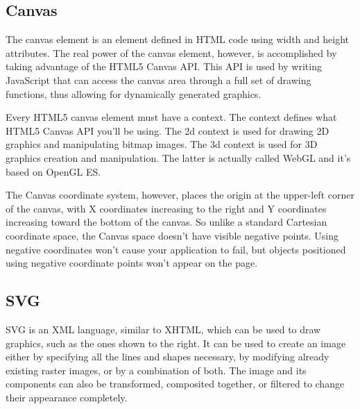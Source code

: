 






\subsection{Canvas}

The canvas element is an element defined in HTML code using width and height attributes. The real power of the canvas element, however, is accomplished by taking advantage of the HTML5 Canvas API. This API is used by writing JavaScript that can access the canvas area through a full set of drawing functions, thus allowing for dynamically generated graphics.

Every HTML5 canvas element must have a context. The context defines what HTML5 Canvas API you’ll be using. The 2d context is used for drawing 2D graphics and manipulating bitmap images. The 3d context is used for 3D graphics creation and manipulation. The latter is actually called WebGL and it’s based on OpenGL ES.

The Canvas coordinate system, however, places the origin at the upper-left corner of the canvas, with X coordinates increasing to the right and Y coordinates increasing toward the bottom of the canvas. So unlike a standard Cartesian coordinate space, the Canvas space doesn’t have visible negative points. Using negative coordinates won’t cause your application to fail, but objects positioned using negative coordinate points won’t appear on the page.


\subsection{SVG}

SVG is an XML language, similar to XHTML, which can be used to draw graphics, such as the ones shown to the right. It can be used to create an image either by specifying all the lines and shapes necessary, by modifying already existing raster images, or by a combination of both. The image and its components can also be transformed, composited together, or filtered to change their appearance completely.

